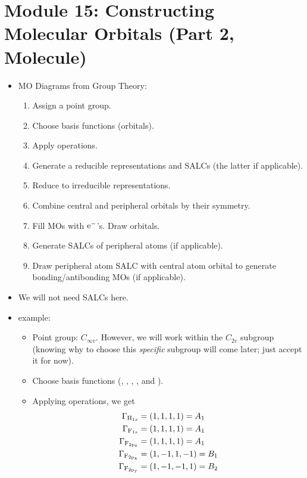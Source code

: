 \documentclass[../notes.tex]{subfiles}
\begin{document}
\section{Module 15: Constructing Molecular Orbitals (Part 2,  Molecule)}
\begin{itemize}
    \item {}MO Diagrams from Group Theory:
    \begin{enumerate}
        \item Assign a point group.
        \item Choose basis functions (orbitals).
        \item Apply operations.
        \item Generate a reducible representations and SALCs (the latter if applicable).
        \item Reduce to irreducible representations.
        \item Combine central and peripheral orbitals by their symmetry.
        \item Fill MOs with $\e[-]$'s. Draw orbitals.
        \item Generate SALCs of peripheral atoms (if applicable).
        \item Draw peripheral atom SALC with central atom orbital to generate bonding/antibonding MOs (if applicable).
    \end{enumerate}
    \item We will not need SALCs here.
    \item {} example:
    \begin{itemize}
        \item Point group: $C_{\infty v}$. However, we will work within the $C_{2v}$ subgroup (knowing why to choose this \emph{specific} subgroup will come later; just accept it for now).
        \item Choose basis functions (, , , , and ).
        \item Applying operations, we get
        \begin{align*}
            \Gamma_{\ce{H_{1s}}} &= (1,1,1,1) = A_1\\
            \Gamma_{\ce{F_{1s}}} &= (1,1,1,1) = A_1\\
            \Gamma_{\ce{F_{2p_z}}} &= (1,1,1,1) = A_1\\
            \Gamma_{\ce{F_{2p_x}}} &= (1,-1,1,-1) = B_1\\
            \Gamma_{\ce{F_{2p_y}}} &= (1,-1,-1,1) = B_2

\end{align*}
\end{itemize}
\end{itemize}
\end{document}
